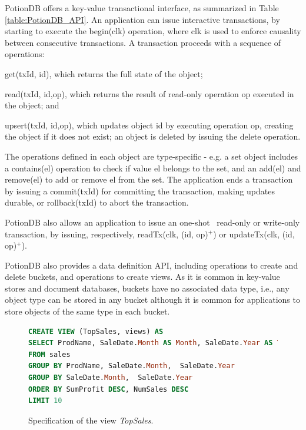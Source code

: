 \documentclass[sigconf, nonacm]{acmart}
\newcommand{\code}[1]{\textsf{\small{#1}}}
\begin{document}
PotionDB offers a key-value  transactional interface, as summarized in Table \ref{table:PotionDB_API}.
An application can issue interactive transactions, by starting to execute the \code{begin(clk)} operation,
where \code{clk} is used to enforce causality between consecutive transactions.
A transaction proceeds with a sequence of operations: 
\begin{inparaenum}[(i)] 
\item \code{get(txId, id)}, which returns the full state of the object;
\item \code{read(txId, id,op)}, which returns the result of read-only operation \code{op} executed in the object; and
\item \code{upsert(txId, id,op)}, which updates object \code{id} by executing operation \code{op}, creating the object if it does not exist; an object is deleted by issuing the delete operation.
\end{inparaenum}
The operations defined in each object are type-specific - e.g. a set object includes a \code{contains(el)} operation to check
if value \code{el} belongs to the set, and an \code{add(el)} and \code{remove(el)} to add or remove \code{el} from the set.
The application ends a transaction by issuing a \code{commit(txId)} for committing the transaction, making updates durable,  or \code{rollback(txId)} to abort the transaction.

PotionDB also allows an application to issue an one-shot~\cite{} read-only or write-only transaction,
by issuing, respectively, \code{readTx(clk, (id, op)$^+$)} or \code{updateTx(clk, (id, op)$^+$)}.

PotionDB also provides a data definition API, including operations to create and delete buckets, and operations
to create views. As it is common in key-value stores and document databases, buckets have no associated
data type, i.e., any object type can be stored in any bucket although it is common for applications to 
store objects of the same type in each bucket.

\begin{figure}[t]
\small{
\begin{lstlisting}[language=SQL]
CREATE VIEW (TopSales, views) AS
SELECT ProdName, SaleDate.Month AS Month, SaleDate.Year AS Year, SUM(Price - Cost) AS SumProfit, COUNT(*) AS NumSales
FROM sales
GROUP BY ProdName, SaleDate.Month,  SaleDate.Year
GROUP BY SaleDate.Month,  SaleDate.Year
ORDER BY SumProfit DESC, NumSales DESC
LIMIT 10
\end{lstlisting}}
	\caption{Specification of the view \emph{TopSales}.}
	\label{fig:topSalesSQL}
\end{figure}
\end{document}
